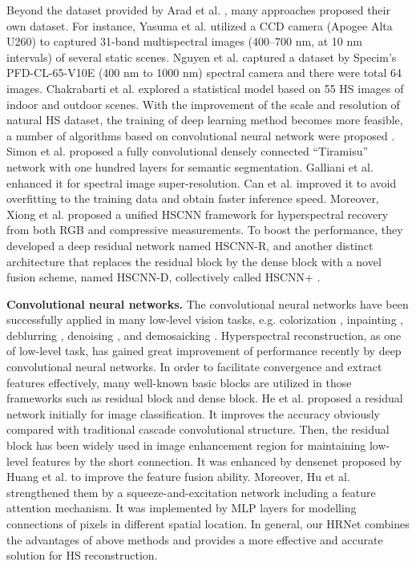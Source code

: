 \documentclass[10pt,twocolumn,letterpaper]{article}
\begin{document}
Beyond the dataset provided by Arad et al. \cite{arad2016sparse}, many approaches proposed their own dataset. For instance, Yasuma et al. \cite{yasuma2010generalized} utilized a CCD camera (Apogee Alta U260) to captured 31-band multispectral images (400–700 nm, at 10 nm intervals) of several static scenes. Nguyen et al. \cite{nguyen2014training} captured a dataset by Specim's PFD-CL-65-V10E (400 nm to 1000 nm) spectral camera and there were total 64 images. Chakrabarti et al. \cite{chakrabarti2011statistics} explored a statistical model based on 55 HS images of indoor and outdoor scenes. With the improvement of the scale and resolution of natural HS dataset, the training of deep learning method becomes more feasible, a number of algorithms based on convolutional neural network were proposed \cite{koundinya20182d, stiebel2018reconstructing}. Simon et al. \cite{jegou2017one} proposed a fully convolutional densely connected “Tiramisu” network with one hundred layers for semantic segmentation. Galliani et al. \cite{galliani2017learned} enhanced it for spectral image super-resolution. Can et al. \cite{can2018efficient} improved it to avoid overfitting to the training data and obtain faster inference speed. Moreover, Xiong et al. \cite{xiong2017hscnn} proposed a unified HSCNN framework for hyperspectral recovery from both RGB and compressive measurements. To boost the performance, they developed a deep residual network named HSCNN-R, and another distinct architecture that replaces the residual block by the dense block with a novel fusion scheme, named HSCNN-D, collectively called HSCNN+ \cite{shi2018hscnn+}.

\textbf{Convolutional neural networks.} The convolutional neural networks have been successfully applied in many low-level vision tasks, e.g. colorization \cite{zhang2016colorful, isola2017image}, inpainting \cite{iizuka2017globally, yu2019free}, deblurring \cite{kupyn2018deblurgan}, denoising \cite{gu2019self, chen2018learning}, and demosaicking \cite{chen2018learning, zhao2019saliency}. Hyperspectral reconstruction, as one of low-level task, has gained great improvement of performance recently by deep convolutional neural networks. In order to facilitate convergence and extract features effectively, many well-known basic blocks are utilized in those frameworks such as residual block and dense block. He et al. \cite{he2016deep} proposed a residual network initially for image classification. It improves the accuracy obviously compared with traditional cascade convolutional structure. Then, the residual block has been widely used in image enhancement region for maintaining low-level features by the short connection. It was enhanced by densenet proposed by Huang et al. \cite{huang2017densely} to improve the feature fusion ability. Moreover, Hu et al. \cite{hu2018squeeze} strengthened them by a squeeze-and-excitation network including a feature attention mechanism. It was implemented by MLP layers for modelling connections of pixels in different spatial location. In general, our HRNet combines the advantages of above methods and provides a more effective and accurate solution for HS reconstruction.
\end{document}
